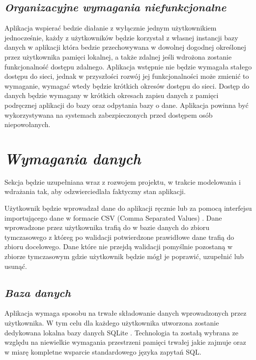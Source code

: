 \documentclass[a4paper,10pt]{report}
\newcommand{\customstylechapter}[1]{\large{\textit{#1}}}
\newcommand{\customstylesection}[1]{\textbf{\textit{#1}}}
\begin{document}
\section{\customstylesection{Organizacyjne wymagania niefunkcjonalne}}
{Aplikacja wspierać bedzie diałanie z wyłącznie jednym użytkownikiem 
jednocześnie, każdy z użytkowników będzie korzystał z własnej instancji bazy 
danych w aplikacji która bedzie przechowywana w dowolnej dogodnej określonej 
przez użytkownika pamięci lokalnej, a także zdalnej jeśli wdrożona zostanie 
funkcjonalność dostępu zdalnego. Aplikacja wstępnie nie będzie wymagała stałego 
dostępu do sieci, jednak w przyszłości rozwój jej funkcjonalności może zmienić 
to wymaganie, wymagać wtedy będzie krótkich okresów dostępu do sieci. Dostęp do 
danych będzie wymagany w krótkich okresach zapisu danych z pamięci podręcznej 
aplikacji do bazy oraz odpytania bazy o dane. Aplikacja powinna być 
wykorzystywana na systemach zabezpieczonych przed dostępem osób niepowołanych.}

\chapter{\customstylechapter{Wymagania danych}}
{Sekcja będzie uzupełniana wraz z rozwojem projektu, w trakcie modelowania i 
wdrażania tak, aby odzwierciedlała faktyczny stan aplikacji.}

{Użytkownik będzie wprowadzał dane do aplikacji ręcznie lub za pomocą interfejsu
importującego dane w formacie CSV (Comma Separated Values) \cite{CSV}. Dane wprowadzone 
przez użytkownika trafią do w bazie danych do zbioru tymczasowego z któreg po 
walidacji potwierdzone prawidłowe dane trafią do zbioru docelowego. Dane które 
nie przejdą walidacji pomyślnie pozostaną w zbiorze tymczasowym gdzie użytkownik 
będzie mógł je poprawić, uzupełnić lub usunąć.}

\section{\customstylesection{Baza danych}}
{Aplikacja wymaga sposobu na trwałe składowanie danych wprowadzonych przez 
użytkownika. W tym celu dla każdego użytkownika utworzona zostanie dedykowana 
lokalna bazy danych SQLite \cite{SQLite}. Technologia ta zostałą wybrana ze 
względu na niewielkie wymagania przestrzeni pamięci trwałej jakie zajmuje oraz 
w miarę kompletne wsparcie standardowego języka zapytań SQL.}
\end{document}
